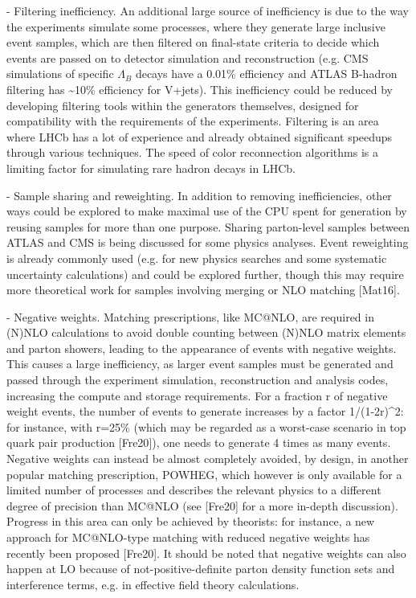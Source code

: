 \documentclass[10pt,a4paper]{article}
\begin{document}
- {Filtering inefficiency}. An additional large source of inefficiency
is due to the way the experiments simulate some processes, where they
generate large inclusive event samples, which are then ﬁltered on
ﬁnal-state criteria to decide which events are passed on to detector
simulation and reconstruction (e.g. CMS simulations of specific
$\Lambda_{B}$ decays have a 0.01\% efficiency and ATLAS B-hadron
filtering has \textasciitilde10\% efficiency for V+jets). This
inefficiency could be reduced by developing ﬁltering tools within the
generators themselves, designed for compatibility with the requirements
of the experiments. Filtering is an area where LHCb has a lot of
experience and already obtained significant speedups through various
techniques. The speed of color reconnection algorithms is a limiting
factor for simulating rare hadron decays in LHCb.

- {Sample sharing and reweighting}. In addition to removing
inefficiencies, other ways could be explored to make maximal use of the
CPU spent for generation by reusing samples for more than one purpose.
Sharing parton-level samples between ATLAS and CMS is being discussed
for some physics analyses. Event reweighting is already commonly used
(e.g. for new physics searches and some systematic uncertainty
calculations) and could be explored further, though this may require
more theoretical work for samples involving merging or NLO matching
{[}Mat16{]}.

- {Negative weights}. Matching prescriptions, like MC@NLO, are required
in (N)NLO calculations to avoid double counting between (N)NLO matrix
elements and parton showers, leading to the appearance of events with
negative weights. This causes a large inefficiency, as larger event
samples must be generated and passed through the experiment simulation,
reconstruction and analysis codes, increasing the compute and storage
requirements. For a fraction r of negative weight events, the number of
events to generate increases by a factor 1/(1-2r)\^{}2: for instance,
with r=25\% (which may be regarded as a worst-case scenario in top quark
pair production {[}Fre20{]}), one needs to generate 4 times as many
events. Negative weights can instead be almost completely avoided, by
design, in another popular matching prescription, POWHEG, which however
is only available for a limited number of processes and describes the
relevant physics to a different degree of precision than MC@NLO (see
{[}Fre20{]} for a more in-depth discussion). Progress in this area can
only be achieved by theorists: for instance, a new approach for
MC@NLO-type matching with reduced negative weights has recently been
proposed {[}Fre20{]}. It should be noted that negative weights can also
happen at LO because of not-positive-definite parton density function
sets and interference terms, e.g. in effective field theory
calculations.
\end{document}
